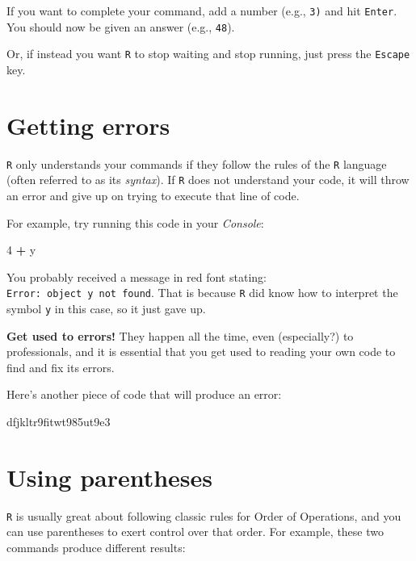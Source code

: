 \documentclass[
]{book}
\newenvironment{Shaded}{\begin{snugshade}}{\end{snugshade}}
\newcommand{\DecValTok}[1]{\textcolor[rgb]{0.00,0.00,0.81}{#1}}
\newcommand{\NormalTok}[1]{#1}
\newcommand{\SpecialCharTok}[1]{\textcolor[rgb]{0.81,0.36,0.00}{\textbf{#1}}}
\begin{document}
If you want to complete your command, add a number (e.g., \texttt{3)} and hit \texttt{Enter}. You should now be given an answer (e.g., \texttt{48}).

Or, if instead you want \texttt{R} to stop waiting and stop running, just press the \texttt{Escape} key.

\section*{Getting errors}\label{getting-errors}

\texttt{R} only understands your commands if they follow the rules of the \texttt{R} language (often referred to as its \emph{syntax}). If \texttt{R} does not understand your code, it will throw an error and give up on trying to execute that line of code.

For example, try running this code in your \emph{Console}:

\begin{Shaded}
\begin{Highlighting}[]
\DecValTok{4} \SpecialCharTok{+}\NormalTok{ y}
\end{Highlighting}
\end{Shaded}

You probably received a message in red font stating: \texttt{Error:\ object\ \textquotesingle{}y\textquotesingle{}\ not\ found}. That is because \texttt{R} did know how to interpret the symbol \texttt{y} in this case, so it just gave up.

\textbf{Get used to errors!} They happen all the time, even (especially?) to professionals, and it is essential that you get used to reading your own code to find and fix its errors.

Here's another piece of code that will produce an error:

\begin{Shaded}
\begin{Highlighting}[]
\NormalTok{dfjkltr9fitwt985ut9e3}
\end{Highlighting}
\end{Shaded}

\section*{Using parentheses}\label{using-parentheses}

\texttt{R} is usually great about following classic rules for Order of Operations, and you can use parentheses to exert control over that order. For example, these two commands produce different results:
\end{document}

